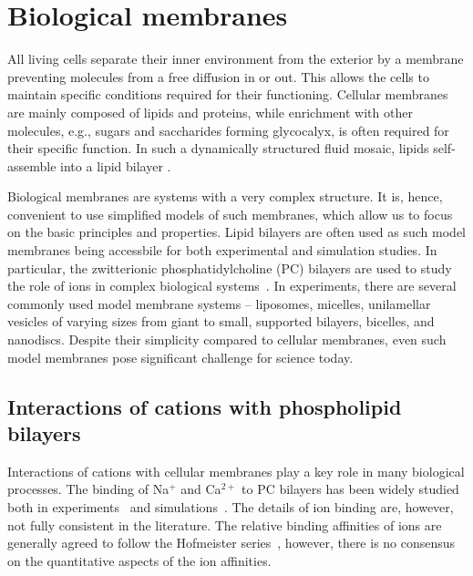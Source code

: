 \chapter{Biological membranes}
\label{chap:intro}


All living cells separate their inner environment from the exterior by a membrane 
preventing molecules from a free diffusion in or out. 
This allows the cells to maintain specific conditions required for their functioning. 
Cellular membranes are mainly composed of lipids and proteins, 
while enrichment with other molecules, e.g., sugars and saccharides forming glycocalyx, 
is often required for their specific function.  \citep{reitsma07} 
In such a dynamically structured fluid mosaic,  %
lipids self-assemble into a lipid bilayer \citep{vereb03,Mouritsen2011,Vattulainen2011}.

Biological membranes are systems with a very complex structure. 
It is, hence, convenient to use simplified models of such membranes, 
which allow us to focus on the basic principles and properties. 
Lipid bilayers are often used as such model membranes 
being accessbile for both experimental and simulation studies. 
In particular, the zwitterionic phosphatidylcholine (PC) bilayers are
used to study the role of ions in complex biological
systems~\citep{scherer87,seelig90,cevc90, vacha09a, javanainen17}.
In experiments, there are several commonly used model membrane systems --
liposomes, 
micelles, 
unilamellar vesicles of varying sizes from giant to small, 
supported bilayers,
bicelles,
and nanodiscs. \citep{keller2017, MolBiolCell, marsh13}
Despite their simplicity compared to cellular membranes,
even such model membranes pose significant challenge for science today. 
\citep{pohl18, melcrova16, javanainen17, magarkar2017, botan15, catte16, Kulig14b, Kulig14, Pluhackova2016, vacha09a}






\section{Interactions of cations with phospholipid bilayers}

Interactions of cations with cellular membranes play a key role in many biological processes. 
The binding of Na$^+$ and Ca$^{2+}$ to PC bilayers has been widely studied both in
experiments~\citep{akutsu81,altenbach84,seelig90,cevc90,tocanne90,binder02,pabst07,uhrikova08}
and simulations~\citep{magarkar2017, bockmann03,bockmann04,berkowitz12,melcrova16,javanainen17, catte16, nmrlipids_proj4}.
The details of ion binding are, however, not fully consistent in the literature.
The relative binding affinities of ions are generally agreed to
follow the Hofmeister series~\citep{eisenberg79,cevc90,tocanne90,binder02,celma07,leontidis09,vacha09a,klasczyk10,harb13}, 
however,
there is no consensus on the quantitative aspects of the ion affinities. 

